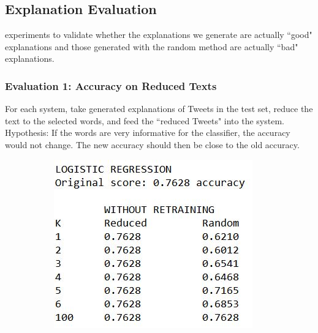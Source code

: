 {\color{blue}
\subsection{Explanation Evaluation}
\label{subsec:expleval}
experiments to validate whether the explanations we generate are actually ``good" explanations and those generated with the random method are actually ``bad" explanations.


\subsubsection{Evaluation 1: Accuracy on Reduced Texts}
For each system, take generated explanations of Tweets in the test set, reduce the text to the selected words, and feed the ``reduced Tweets" into the system. Hypothesis: If the words are very informative for the classifier, the accuracy would not change. The new accuracy should then be close to the old accuracy.\newline
\begin{figure}[H]
	\centering
	\begin{subfigure}[b]{0.4\textwidth}
		\includegraphics[width=\textwidth]{img/expleval1_logreg.JPG}
	\end{subfigure}
	\begin{subfigure}[b]{0.4\textwidth}

\end{subfigure}
\end{figure}}
